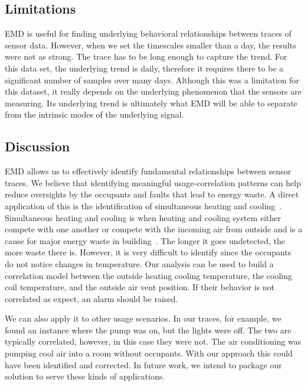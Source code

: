 \subsection{Limitations}
EMD is useful for finding underlying behavioral relationships between traces of sensor data.  However,
when we set the timescales smaller than a day, the results were not as strong.
The trace has to be long enough to capture the trend.  For this data set, the underlying
trend is daily, therefore it requires there to be a significant number of samples over many days.
Although this was a limitation for this dataset, it really depends on the underlying phenomenon that
the sensors are measuring.  Its underlying trend is ultimately what EMD will be able to separate
from the intrinsic modes of the underlying signal.

\subsection{Discussion}
EMD allows us to effectively identify fundamental relationships between sensor traces.
We believe that identifying meaningful usage-correlation patterns can help reduce oversights
by the occupants and faults that lead to energy waste.  A direct application of this is the identification
of simultaneous heating and cooling~\cite{simheatcool}.  Simultaneous heating and cooling is when heating
and cooling system either compete with one another or compete with the incoming air from outside and is
a cause for major energy waste in building~\cite{simheatcool}.  The longer it goes undetected,
the more waste there is.  However, it is very difficult to identify since the occupants do not notice
changes in temperature.  Our analysis can be used to build a correlation model between the outside
heating cooling temperature, the cooling coil temperature, and the outside air vent position.  If their behavior
is not correlated as expect, an alarm should be raised.

We can also apply it to other usage scenarios.  In our traces, for example, we found an instance where the pump
was on, but the lights were off.  The two are typically correlated, however, in this case they were not.
The air conditioning was pumping cool air into a room without occupants.
With our approach this could have been identified and corrected.  In future work, we intend to
package our solution to serve these kinds of applications.

